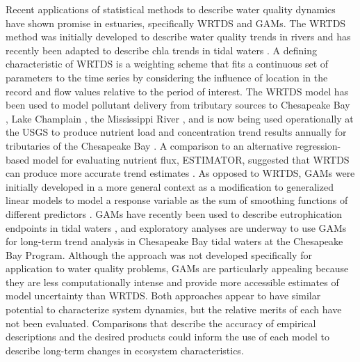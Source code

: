 \documentclass[letterpaper,12pt,oneside]{article}\usepackage[]{graphicx}\usepackage[]{color}
\begin{document}
Recent applications of statistical methods to describe water quality dynamics have shown promise in estuaries, specifically \ac{WRTDS} and \acp{GAM}.  The \ac{WRTDS} method was initially developed to describe water quality trends in rivers \citep{Hirsch10,Hirsch14} and has recently been adapted to describe \ac{chla} trends in tidal waters \citep{Beck15}.  A defining characteristic of \ac{WRTDS} is a weighting scheme that fits a continuous set of parameters to the time series by considering the influence of location in the record and flow values relative to the period of interest.  The \ac{WRTDS} model has been used to model pollutant delivery from tributary sources to Chesapeake Bay \citep{Hirsch10,Moyer12,Zhang13}, Lake Champlain \citep{Medalie12}, the Mississippi River \citep{Sprague11}, and is now being used operationally at the \ac{USGS} to produce nutrient load and concentration trend results annually for tributaries of the Chesapeake Bay \citep{USGS15}.  A comparison to an alternative regression-based model for evaluating nutrient flux, ESTIMATOR, suggested that \ac{WRTDS} can produce more accurate trend estimates \citep{Moyer12}. As opposed to \ac{WRTDS}, \acp{GAM} were initially developed in a more general context as a modification to generalized linear models to model a response variable as the sum of smoothing functions of different predictors \citep{Hastie90,Wood06}.  \acp{GAM} have recently been used to describe eutrophication endpoints in tidal waters \citep{Haraguchi15,Harding16}, and exploratory analyses are underway to use \acp{GAM} for long-term trend analysis in Chesapeake Bay tidal waters at the Chesapeake Bay Program. Although the approach was not developed specifically for application to water quality problems, \acp{GAM} are particularly appealing because they are less computationally intense and provide more accessible estimates of model uncertainty than \ac{WRTDS}. Both approaches appear to have similar potential to characterize system dynamics, but the relative merits of each have not been evaluated. Comparisons that describe the accuracy of empirical descriptions and the desired products could inform the use of each model to describe long-term changes in ecosystem characteristics.
\end{document}
